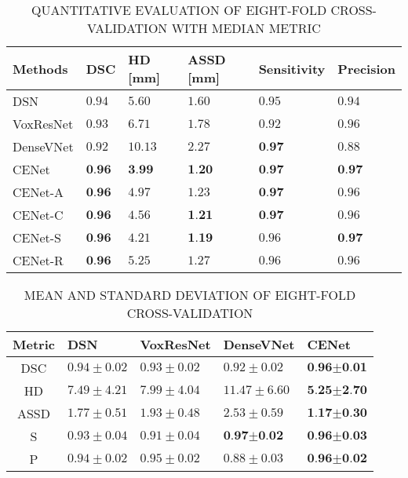 \documentclass[journal]{IEEEtran}
\begin{document}
\begin{table*}[t]%
\renewcommand{\arraystretch}{1.7}
\captionsetup{justification=centering, labelsep=newline}
\caption{QUANTITATIVE EVALUATION OF EIGHT-FOLD CROSS-VALIDATION WITH MEDIAN METRIC}
\label{table:results}
\begin{tabularx}{\textwidth}{X||>{\centering\arraybackslash}X|>{\centering\arraybackslash}X|>{\centering\arraybackslash}X|>{\centering\arraybackslash}X|>{\centering\arraybackslash}X}
Methods & DSC & HD [mm] & ASSD [mm] & Sensitivity & Precision\\
\hline
DSN \cite{dou20173d} & \(0.94\) & \(5.60\) & \(1.60\) & \(0.95\) & \(0.94\)\\
VoxResNet \cite{chen2017voxresnet} & \(0.93\) & \(6.71\) & \(1.78\) & \(0.92\) & \(0.96\)\\
DenseVNet \cite{gibson2018automatic} & \(0.92\) & \(10.13\) & \(2.27\) & \(\textbf{0.97}\) & \(0.88\)\\
CENet & \(\textbf{0.96}\) & \(\textbf{3.99}\) & \(\textbf{1.20}\) & \(\textbf{0.97}\) & \(\textbf{0.97}\)\\
CENet-A & \(\textbf{0.96}\) & \(4.97\) & \(1.23\) & \(\textbf{0.97}\) & \(0.96\)\\
CENet-C & \(\textbf{0.96}\) & \(4.56\) & \(\textbf{1.21}\) & \(\textbf{0.97}\) & \(0.96\)\\
CENet-S & \(\textbf{0.96}\) & \(4.21\) & \(\textbf{1.19}\) & \(0.96\) & \(\textbf{0.97}\)\\
CENet-R & \(\textbf{0.96}\) & \(5.25\) & \(1.27\) & \(0.96\) & \(0.96\)\\
\end{tabularx}
\end{table*}

\begin{table}[t]%
\renewcommand{\arraystretch}{1.7}
\captionsetup{justification=centering, labelsep=newline}
\caption{MEAN AND STANDARD DEVIATION OF EIGHT-FOLD CROSS-VALIDATION}
\label{table:results_stat}
\begin{tabularx}{\linewidth}{c||X|X|X|X}
Metric & DSN \cite{dou20173d} & VoxResNet \cite{chen2017voxresnet} & DenseVNet \cite{gibson2018automatic} & CENet\\
\hline
DSC & \(0.94\pm0.02\) & \(0.93\pm0.02\) & \(0.92\pm0.02\) & \(\textbf{0.96}\pmb{\pm}\textbf{0.01}\)\\
HD & \(7.49\pm4.21\) & \(7.99\pm4.04\) & \(11.47\pm6.60\) & \(\textbf{5.25}\pmb{\pm}\textbf{2.70}\)\\
ASSD & \(1.77\pm0.51\) & \(1.93\pm0.48\) & \(2.53\pm0.59\) & \(\textbf{1.17}\pmb{\pm}\textbf{0.30}\)\\
S & \(0.93\pm0.04\) & \(0.91\pm0.04\) & \(\textbf{0.97}\pmb{\pm}\textbf{0.02}\) & \(\textbf{0.96}\pmb{\pm}\textbf{0.03}\)\\
P & \(0.94\pm0.02\) & \(0.95\pm0.02\) & \(0.88\pm0.03\) & \(\textbf{0.96}\pmb{\pm}\textbf{0.02}\)\\
\end{tabularx}
\end{table}
\end{document}
